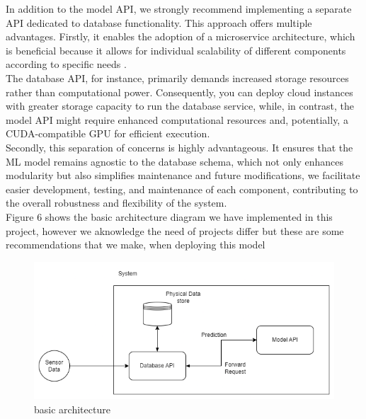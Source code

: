 \documentclass{article}
\begin{document}
In addition to the model API, we strongly recommend implementing a separate API dedicated to database functionality. This approach offers multiple advantages. Firstly, it enables the adoption of a microservice architecture, which is beneficial because it allows for individual scalability of different components according to specific needs \cite{Patel2021}. \\

The database API, for instance, primarily demands increased storage resources rather than computational power. Consequently, you can deploy cloud instances with greater storage capacity to run the database service, while, in contrast, the model API might require enhanced computational resources and, potentially, a CUDA-compatible GPU for efficient execution.\\

Secondly, this separation of concerns is highly advantageous. It ensures that the ML model remains agnostic to the database schema, which not only enhances modularity but also simplifies maintenance and future modifications, we facilitate easier development, testing, and maintenance of each component, contributing to the overall robustness and flexibility of the system. \\

Figure 6 shows the basic architecture diagram we have implemented in this project, however we aknowledge the need of projects differ but these are some recommendations that we make, when deploying this model

\begin{figure}
    \centering
    \includegraphics[width=1\linewidth]{architecture_basic.png}
    \caption{basic architecture}
    \label{fig:architecture}
\end{figure}

\newpage



\end{document}
